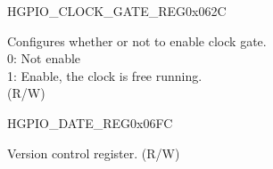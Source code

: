 \begin{register}{H}{GPIO\_CLOCK\_GATE\_REG}{0x062C}\label{regdesc:GPIOCLOCKGATEREG}
%
%
\regnewline%
\begin{regdesc}\begin{reglist}
\label{fielddesc:GPIOCLKEN}\item [GPIO\_CLK\_EN] Configures whether or not to enable clock gate.\\
0: Not enable\\
1: Enable, the clock is free running. \\(R/W)
\end{reglist}\end{regdesc}
\end{register}


\begin{register}{H}{GPIO\_DATE\_REG}{0x06FC}\label{regdesc:GPIOREGDATEREG}
%
%
\regnewline%
\begin{regdesc}\begin{reglist}
\label{fielddesc:GPIOREGDATE}\item [GPIO\_DATE] Version control register. (R/W)
\end{reglist}\end{regdesc}
\end{register}

